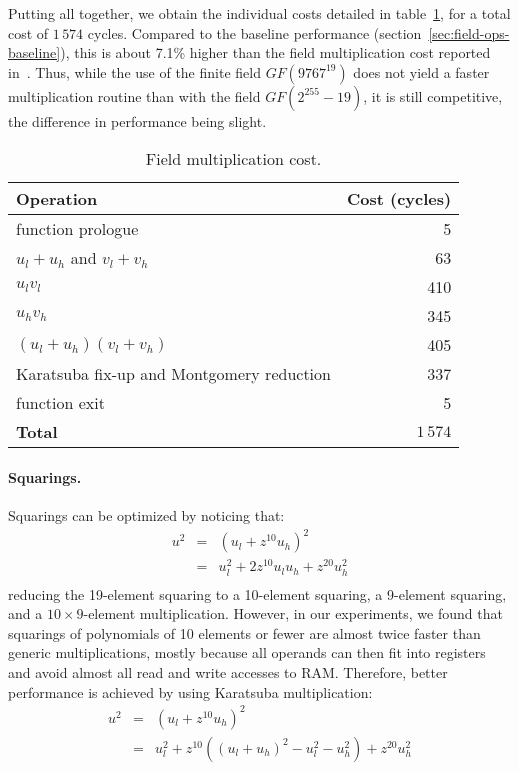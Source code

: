 \documentclass{llncs}
\newcommand{\GF}{GF}
\begin{document}
Putting all together, we obtain the individual costs detailed in
table~\ref{tab:fieldmul}, for a total cost of $1\,574$ cycles. Compared
to the baseline performance (section~\ref{sec:field-ops-baseline}), this
is about 7.1\% higher than the field multiplication cost reported
in~\cite{DulHaaHinHutPaaSanSch2015}. Thus, while the use of the finite
field $\GF(9767^{19})$ does not yield a faster multiplication routine
than with the field $\GF(2^{255}-19)$, it is still competitive, the
difference in performance being slight.

\begin{table}[H]
\begin{center}
    \begin{tabular}{|l|r|}
    \hline
    \textsf{\textbf{Operation}} & \textsf{\textbf{Cost (cycles)}} \\
    \hline
    function prologue                          &        5 \\
    $u_l+u_h$ and $v_l+v_h$                    &       63 \\
    $u_l v_l$                                  &      410 \\
    $u_h v_h$                                  &      345 \\
    $(u_l+u_h)(v_l+v_h)$                       &      405 \\
    Karatsuba fix-up and Montgomery reduction  &      337 \\
    function exit                              &        5 \\
    \hline
    \textsf{\textbf{Total}}                    & $1\,574$ \\
    \hline
    \end{tabular}
\end{center}
\caption{\label{tab:fieldmul}Field multiplication cost.}
\end{table}

\paragraph{Squarings.}

Squarings can be optimized by noticing that:
\begin{eqnarray*}
    u^2 &=& (u_l + z^{10} u_h)^2 \\
        &=& u_l^2 + 2 z^{10} u_l u_h + z^{20} u_h^2 \\
\end{eqnarray*}
reducing the 19-element squaring to a 10-element squaring, a 9-element
squaring, and a $10\times 9$-element multiplication. However, in our
experiments, we found that squarings of polynomials of 10 elements or
fewer are almost twice faster than generic multiplications, mostly because
all operands can then fit into registers and avoid almost all read and
write accesses to RAM. Therefore, better performance is achieved by
using Karatsuba multiplication:
\begin{eqnarray*}
    u^2 &=& (u_l + z^{10} u_h)^2 \\
        &=& u_l^2 + z^{10} ((u_l+u_h)^2 - u_l^2 - u_h^2) + z^{20} u_h^2 \\
\end{eqnarray*}
\end{document}
